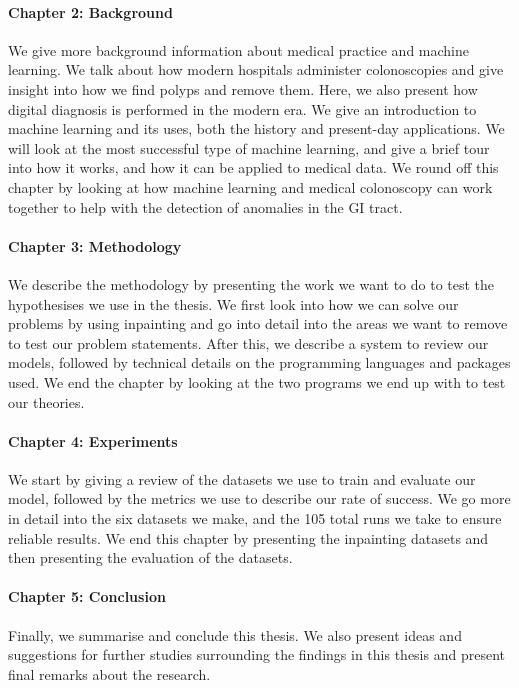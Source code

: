 \paragraph{Chapter 2: Background}
We give more background information about medical practice and machine learning.
We talk about how modern hospitals administer colonoscopies and give insight into how we find polyps and remove them. Here, we also present how digital diagnosis is performed in the modern era.  
We give an introduction to machine learning and its uses, both the history and present-day applications. We will look at the most successful type of machine learning, and give a brief tour into how it works, and how it can be applied to medical data.
We round off this chapter by looking at how machine learning and medical colonoscopy can work together to help with the detection of anomalies in the GI tract.

\paragraph{Chapter 3: Methodology }
We describe the methodology by presenting the work we want to do to test the hypothesises we use in the thesis.
We first look into how we can solve our problems by using inpainting and go into detail into the areas we want to remove to test our problem statements. 
After this, we describe a system to review our models, followed by technical details on the programming languages and packages used.
We end the chapter by looking at the two programs we end up with to test our theories. 

\paragraph{Chapter 4: Experiments}
We start by giving a review of the datasets we use to train and evaluate our model, followed by the metrics we use to describe our rate of success.
We go more in detail into the six datasets we make, and the 105 total runs we take to ensure reliable results.
We end this chapter by presenting the inpainting datasets and then presenting the evaluation of the datasets.


\paragraph{Chapter 5: Conclusion}
Finally, we summarise and conclude this thesis.
We also present ideas and suggestions for further studies surrounding
the findings in this thesis and present final remarks about the research.


